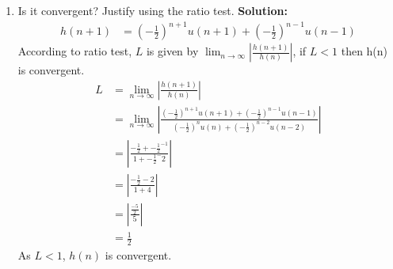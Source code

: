 \documentclass[journal,12pt,twocolumn]{IEEEtran}
\newcommand{\solution}{\noindent \textbf{Solution: }}
\providecommand{\brak}[1]{\ensuremath{\left(#1\right)}}
\providecommand{\abs}[1]{\left\vert#1\right\vert}
\numberwithin{equation}{section}
\renewcommand\thesection{\arabic{section}}
\begin{document}
\begin{enumerate}[label=\thesection.\arabic*]
 \item Is it convergent? Justify using the ratio test.
\solution
\begin{align}
h(n+1)&=\brak{-\frac{1}{2}}^{n+1}u(n+1) + \brak{-\frac{1}{2}}^{n-1}u(n-1)
\end{align}
According to ratio test, $L$ is given by $\lim_{n\to \infty}\abs{\frac{h(n+1)}{h(n)}}$, if $L < 1$ then h(n) is convergent.
\begin{align}
L&=\lim_{n\to \infty}\abs{\frac{h(n+1)}{h(n)}}\\
&=\lim_{n\to \infty}\abs{\frac{\brak{-\frac{1}{2}}^{n+1}u(n+1) + \brak{-\frac{1}{2}}^{n-1}u(n-1)}{\brak{-\frac{1}{2}}^{n}u(n) + \brak{-\frac{1}{2}}^{n-2}u(n-2)}}\\
&=\abs{\frac{-\frac{1}{2} + {-\frac{1}{2}}^{-1}}{1 + {-\frac{1}{2}}^-2}}\\
&=\abs{\frac{-\frac{1}{2}-2}{1+4}}\\
&=\abs{\frac{\frac{-5}{2}}{5}}\\
&=\frac{1}{2}
\end{align}
As $L < 1$, $h(n)$ is convergent.


\end{enumerate}
\end{document}

